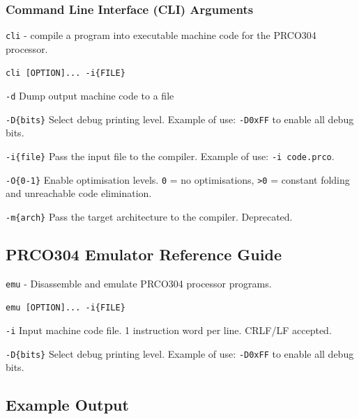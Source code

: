 \documentclass[11pt,a4paper]{report}
\newcommand{\scname}{PRCO304}
\begin{document}
\subsubsection*{Command Line Interface (CLI) Arguments}
\label{sect:compiler_cli}
\begin{description}[style=nextline]
\item [Name]
\verb|cli| - compile a program into executable machine code for the \scname{} processor.

\item[Synopsis]
\verb|cli [OPTION]... -i{FILE}|

\item [Description]
\verb|-d| Dump output machine code to a file

\verb|-D{bits}| Select debug printing level. Example of use: \verb|-D0xFF| to enable all debug bits. 

\verb|-i{file}| Pass the input file to the compiler. Example of use: \verb|-i code.prco|.

\verb|-O{0-1}| Enable optimisation levels. \verb|0| = no optimisations, \verb|>0| = constant folding and unreachable code elimination.

\verb|-m{arch}| Pass the target architecture to the compiler. Deprecated.

\end{description}


\subsection{\scname{} Emulator Reference Guide}
\label{sect:emulator_cli}
\begin{description}[style=nextline]
\item [Name]
\verb|emu| - Disassemble and emulate \scname{} processor programs.

\item[Synopsis]
\verb|emu [OPTION]... -i{FILE}|

\item [Description]
\verb|-i| Input machine code file. 1 instruction word per line. CRLF/LF accepted.
\end{description}

\verb|-D{bits}| Select debug printing level. Example of use: \verb|-D0xFF| to enable all debug bits. 

\subsection*{Example Output}
\inputminted{text}{emu_output.tex}
\end{document}

